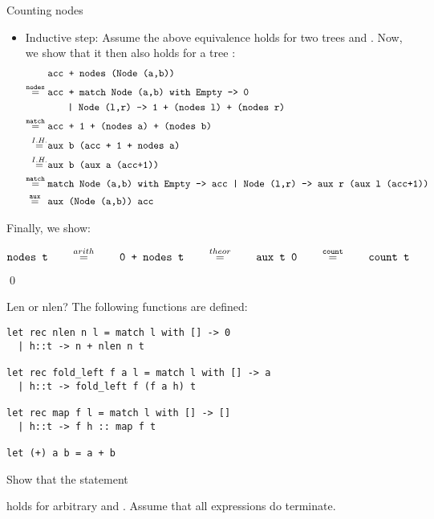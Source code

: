 \documentclass[
  english
]{tumteaching}
\newcommand{\qsmio}[1]{\text{\texttt{#1}}}
\begin{document}
\begin{assignment}[L]{Counting nodes}
\begin{solution}
\begin{itemize}
      \item Inductive step: Assume the above equivalence holds for two trees  and . Now, we show that it then also holds for a tree :
        \begin{align*}
          &\;\qsmio{acc + nodes (Node (a,b))}\\
          \overset{\qsmio{nodes}}{=}&\;\qsmio{acc + match Node (a,b) with Empty -> 0}\\&\;\qquad\qsmio{| Node (l,r) -> 1 + (nodes l) + (nodes r)}\\
          \overset{\qsmio{match}}{=}&\;\qsmio{acc + 1 + (nodes a) + (nodes b)}\\
          \overset{I.H.}{=}\hspace*{-0.8mm}&\;\qsmio{aux b (acc + 1 + nodes a)}\\
          \overset{I.H.}{=}\hspace*{-0.8mm}&\;\qsmio{aux b (aux a (acc+1))}\\
          \overset{\qsmio{match}}{=}&\;\qsmio{match Node (a,b) with Empty -> acc | Node (l,r) -> aux r (aux l (acc+1))}\\
          \overset{\qsmio{aux}}{=}\hspace*{1.5mm}&\;\qsmio{aux (Node (a,b)) acc}\\
        \end{align*}
    \end{itemize}

    \vspace*{3mm}
    \noindent Finally, we show:
    \begin{center}
      $\qsmio{nodes t} \qquad \overset{arith}{=} \qquad \qsmio{0 + nodes t} \qquad \overset{theor}{=} \qquad \qsmio{aux t 0} \qquad \overset{\qsmio{count}}{=} \qquad \qsmio{count t}$
    \end{center}
    \qed
  \end{solution}
\end{assignment}


\begin{assignment}[H,points=5]{Len or nlen?}
  The following functions are defined:
  \begin{verbatim}
let rec nlen n l = match l with [] -> 0
  | h::t -> n + nlen n t

let rec fold_left f a l = match l with [] -> a
  | h::t -> fold_left f (f a h) t

let rec map f l = match l with [] -> []
  | h::t -> f h :: map f t

let (+) a b = a + b
  \end{verbatim}
  Show that the statement
  \begin{center}
  \end{center}
  holds for arbitrary  and . Assume that all expressions do terminate.

\end{assignment}
\end{document}

